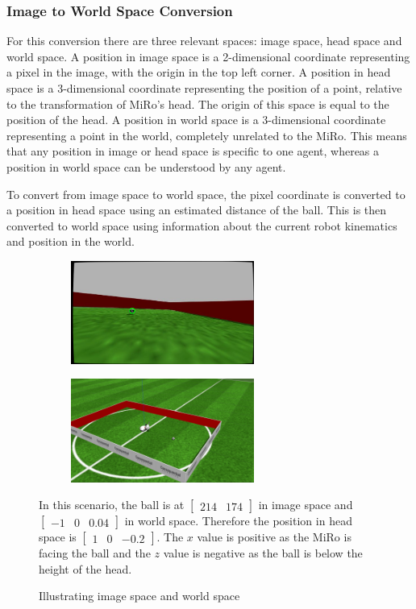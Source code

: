 \subsubsection{Image to World Space Conversion}

For this conversion there are three relevant spaces: image space, head space and world space. A position in image space is a 2-dimensional coordinate representing a pixel in the image, with the origin in the top left corner. A position in head space is a 3-dimensional coordinate representing the position of a point, relative to the transformation of MiRo's head. The origin of this space is equal to the position of the head. A position in world space is a 3-dimensional coordinate representing a point in the world, completely unrelated to the MiRo. This means that any position in image or head space is specific to one agent, whereas a position in world space can be understood by any agent.

To convert from image space to world space, the pixel coordinate is converted to a position in head space using an estimated distance of the ball. This is then converted to world space using information about the current robot kinematics and position in the world. 

\begin{figure}[ht]
    \begin{subfigure}[b]{0.4\textwidth}
        \centering
        \includegraphics[width=6cm]{images/imagespace.png}
    \end{subfigure}
    \begin{subfigure}[b]{0.4\textwidth}
        \centering
        \includegraphics[width=6cm]{images/worldspace.png}
    \end{subfigure}
\centering

In this scenario, the ball is at $\begin{bmatrix}214 & 174 \end{bmatrix}$ in image space and $\begin{bmatrix}-1 & 0 & 0.04 \end{bmatrix}$ in world space. Therefore the position in head space is $\begin{bmatrix}1 & 0 & -0.2 \end{bmatrix}$. The $x$ value is positive as the MiRo is facing the ball and the $z$ value is negative as the ball is below the height of the head.
\caption{Illustrating image space and world space}
\end{figure}

